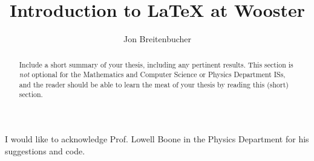 \documentclass[10pt,palatino,code,picins,tikz,kaukecopyright,openright,lshortwooster,dropcaps,verbatim,index,euler]{woosterthesis}
\title{Introduction to \LaTeX{} at Wooster}
\author{Jon Breitenbucher}
\begin{document}
%
%

\frontmatter
\maketitle
\ClearShipoutPicture
\clearpage\thispagestyle{empty}\null\clearpage
\disscopyright 

%                                                                                       
%                                                                                       

\begin{abstract}
Include a short summary of your thesis, including any pertinent results.  This section is \emph{not} optional for the Mathematics and Computer Science or Physics Department ISs, and the reader should be able to learn the meat of your thesis by reading this (short) section.
\end{abstract}

%                                                                                       
%                                                                                       

\dedication{This work is dedicated to the future generations of Wooster students.}


%                                                                                       
%                                                                                       

\begin{acknowl}  
I would like to acknowledge Prof. Lowell Boone in the Physics Department for his suggestions and code.
\end{acknowl}
\end{document}
